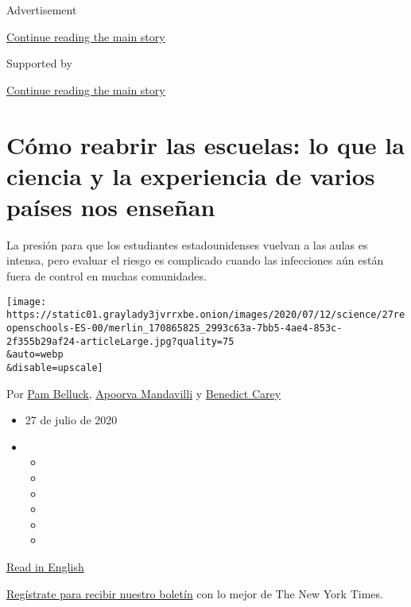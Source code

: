 Advertisement

\protect\hyperlink{after-top}{Continue reading the main story}

Supported by

\protect\hyperlink{after-sponsor}{Continue reading the main story}

\hypertarget{cuxf3mo-reabrir-las-escuelas-lo-que-la-ciencia-y-la-experiencia-de-varios-pauxedses-nos-enseuxf1an}{%
\section{Cómo reabrir las escuelas: lo que la ciencia y la experiencia
de varios países nos
enseñan}\label{cuxf3mo-reabrir-las-escuelas-lo-que-la-ciencia-y-la-experiencia-de-varios-pauxedses-nos-enseuxf1an}}

La presión para que los estudiantes estadounidenses vuelvan a las aulas
es intensa, pero evaluar el riesgo es complicado cuando las infecciones
aún están fuera de control en muchas comunidades.

\texttt{[image: https://static01.graylady3jvrrxbe.onion/images/2020/07/12/science/27reopenschools-ES-00/merlin\_170865825\_2993c63a-7bb5-4ae4-853c-2f355b29af24-articleLarge.jpg?quality=75\\\&auto=webp\\\&disable=upscale]}

Por \href{https://www.nytimes3xbfgragh.onion/by/pam-belluck}{Pam
Belluck},
\href{https://www.nytimes3xbfgragh.onion/by/apoorva-mandavilli}{Apoorva
Mandavilli} y
\href{https://www.nytimes3xbfgragh.onion/by/benedict-carey}{Benedict
Carey}

\begin{itemize}
\item
  27 de julio de 2020
\item
  \begin{itemize}
  \item
  \item
  \item
  \item
  \item
  \item
  \end{itemize}
\end{itemize}

\href{https://www.nytimes3xbfgragh.onion/2020/07/11/health/coronavirus-schools-reopen.html}{Read
in English}

\href{https://www.nytimes3xbfgragh.onion/newsletters/el-times}{Regístrate
para recibir nuestro boletín} con lo mejor de The New York Times.

